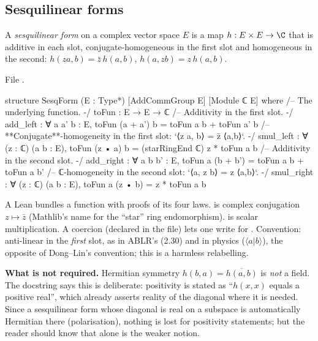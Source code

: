 \subsection{Sesquilinear forms}

\begin{definition}\label{l19:def:sesq}
A \emph{sesquilinear form} on a complex vector space $E$ is a map $h:E\times E\to\C$ that is
additive in each slot, conjugate-homogeneous in the first slot and homogeneous in the second:
$h(za,b) = \bar z\,h(a,b)$, $h(a,zb) = z\,h(a,b)$.
\end{definition}

\noindent File .
\begin{leancode}
structure SesqForm (E : Type*) [AddCommGroup E] [Module ℂ E] where
  /-- The underlying function. -/
  toFun : E → E → ℂ
  /-- Additivity in the first slot. -/
  add_left : ∀ a a' b : E, toFun (a + a') b = toFun a b + toFun a' b
  /-- **Conjugate**-homogeneity in the first slot: `⟨z a, b⟩ = z̄ ⟨a,b⟩`. -/
  smul_left : ∀ (z : ℂ) (a b : E), toFun (z • a) b = (starRingEnd ℂ) z * toFun a b
  /-- Additivity in the second slot. -/
  add_right : ∀ a b b' : E, toFun a (b + b') = toFun a b + toFun a b'
  /-- ℂ-homogeneity in the second slot: `⟨a, z b⟩ = z ⟨a,b⟩`. -/
  smul_right : ∀ (z : ℂ) (a b : E), toFun a (z • b) = z * toFun a b
\end{leancode}

\begin{dictionary}
A Lean  bundles a function  with proofs of its four laws.
 is complex conjugation $z\mapsto\bar z$ (Mathlib's name for the ``star''
ring endomorphism).  is scalar multiplication. A coercion (declared in the file) lets
one write  for . Convention: anti-linear in the \emph{first} slot,
as in ABLR's (2.30) and in physics ($\langle a|b\rangle$), the opposite of Dong--Lin's
convention; this is a harmless relabelling.

\textbf{What is not required.} Hermitian symmetry $h(b,a) = \overline{h(a,b)}$ is \emph{not} a field.
The docstring says this is deliberate: positivity is stated as ``$h(x,x)$ equals a positive
real'', which already asserts reality of the diagonal where it is needed. Since a sesquilinear form
whose diagonal is real on a subspace is automatically Hermitian there (polarisation), nothing is lost
for positivity statements; but the reader should know that  alone is the weaker
notion.
\end{dictionary}

